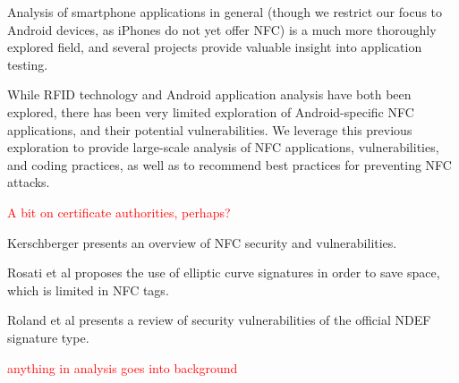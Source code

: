 \documentclass[12pt]{article}
\newcommand\TODO[1]{\textcolor{red}{#1}}
\begin{document}
Analysis of smartphone applications in general (though we restrict our focus to Android devices, as iPhones do not yet offer NFC) is a much more thoroughly explored field, and several projects provide valuable insight into application testing.

While RFID technology and Android application analysis have both been explored, there has been very limited exploration of Android-specific NFC applications, and their potential vulnerabilities. We leverage this previous exploration to provide large-scale analysis of NFC applications, vulnerabilities, and coding practices, as well as to recommend best practices for preventing NFC attacks.

\TODO{A bit on certificate authorities, perhaps?}

Kerschberger\cite{kerschberger2011} presents an overview of NFC security and vulnerabilities.

Rosati et al\cite{rosati2011} proposes the use of elliptic curve signatures in order to save space, which is limited in NFC tags.

Roland et al\cite{roland2011} presents a review of security vulnerabilities of the official NDEF signature type.

\TODO{anything in analysis goes into background}
\end{document}
